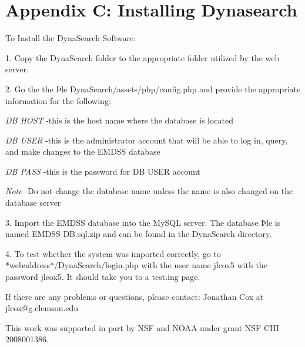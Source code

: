 \documentclass[article]{ij4uq}              %
\begin{document}
\section{Appendix C: Installing Dynasearch}
To Install the DynaSearch Software:

1. Copy the DynaSearch folder to the appropriate folder utilized by the web server. 

2. Go the the Þle DynaSearch/assets/php/config.php and provide the 
appropriate information for the following: 


\emph{DB HOST} -this is the host name where the database is located
	
\emph{DB USER} -this is the administrator account that will be able to log in, query, and make changes to the EMDSS database
	
\emph{DB PASS} -this is the password for DB USER account
	
\emph{Note} -Do not change the database name unless the name is also changed 
on the database server 

3. Import the EMDSS database into the MySQL server. The database Þle is named EMDSS DB.sql.zip and can be found in the DynaSearch directory. 


4. To test whether the system was imported correctly, go to *webaddress*/DynaSearch/login.php with the user name jlcox5 with the password jlcox5. It should take you to a test.ing page. 

If there are any problems or questions, please contact: 
Jonathan Cox at jlcox@g.clemson.edu 

\acknowledgements

This work was supported in part by NSF and NOAA under grant NSF CHI 2008001386.















\end{document}
